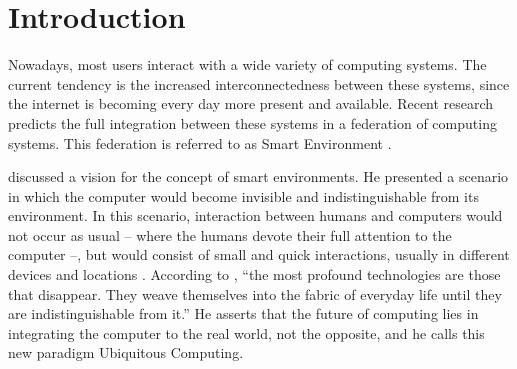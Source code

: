 \documentclass{svjour3}                     %
\begin{document}
\begin{abstract}
Context-aware and ubiquitous systems have the challenge of implicitly collect relevant information about entities, and use this information to understand and predict their behaviour. This allows the applications to adapt themselves to the entities, thus avoiding to overflow them with inquires and information. The analysis of trails, the context-aware history of actions, can further improve the relevance of information. This paper proposes a model that allows applications to register entities' actions in trails and infer profile information from these trails, using semantic interoperability and thus allowing different applications to share information and infer a unified profile. A prototype was developed for the evaluation of the model, and it was integrated with two different softwares. It was verified that was possible to enrich the profile generation of applications through this integration. The contributions of this model are the use of trails for extracting profiles and the capability of managing dynamic inference rules for profile generation.
\end{abstract}


\section{Introduction}
\label{ch:introducao}

Nowadays, most users interact with a wide variety of computing systems. The current tendency is the increased interconnectedness between these systems, since the internet is becoming every day more present and available. Recent research predicts the full integration between these systems in a federation of computing systems. This federation is referred to as Smart Environment \citep{heckmann05,augusto10}.

\citet{weiser91} discussed a vision for the concept of smart environments. He
presented a scenario in which the computer would become invisible and
indistinguishable from its environment. In this scenario, interaction between
humans and computers would not occur as usual -- where the humans devote their
full attention to the computer --, but would consist of small and quick
interactions, usually in different devices and locations \citep{weiser96}.
According to \citet{weiser91}, ``the most profound technologies are those that
disappear. They weave themselves into the fabric of everyday life until they
are indistinguishable from it.'' He asserts that the future
of computing lies in integrating the computer to the real world, not the
opposite, and he calls this new paradigm Ubiquitous Computing.
\end{document}
